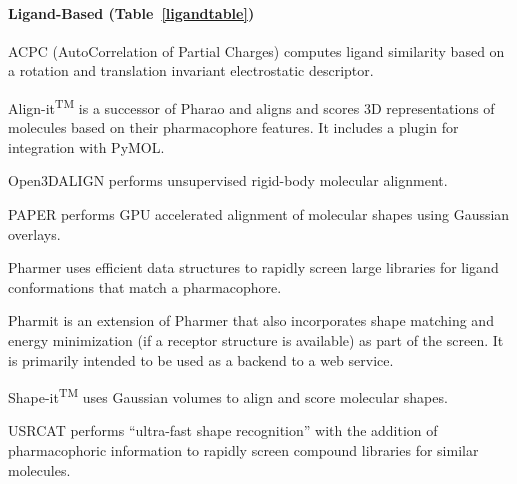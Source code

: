 \paragraph{Ligand-Based (Table~\ref{ligandtable})}

ACPC (AutoCorrelation of Partial Charges) \cite{Berenger_2014} computes ligand similarity based on a rotation and translation invariant electrostatic descriptor.

Align-it\textsuperscript{TM} is a successor of Pharao \cite{Taminau_2008} and aligns and scores 3D representations of molecules based on their pharmacophore features.  It includes a plugin for integration with PyMOL.

Open3DALIGN \cite{Tosco_2011} performs unsupervised rigid-body molecular alignment.

PAPER \cite{Haque_2010} performs GPU accelerated alignment of molecular shapes using Gaussian overlays.

Pharmer \cite{Koes_2011} uses efficient data structures to rapidly screen large libraries for ligand conformations that match a pharmacophore.

Pharmit \cite{Sunseri_2016} is an extension of Pharmer that also incorporates shape matching and energy minimization (if a receptor structure is available) as part of the screen.  It is primarily intended to be used as a backend to a web service.

Shape-it\textsuperscript{TM} uses Gaussian volumes to align and score molecular shapes.

USRCAT \cite{Schreyer_2012} performs ``ultra-fast shape recognition'' with the addition of pharmacophoric information to rapidly screen compound libraries for similar molecules.


